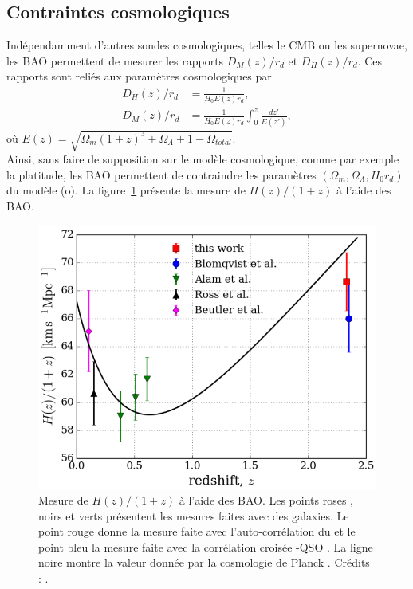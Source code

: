 \documentclass[11pt, twoside, a4paper, openright]{report}
\begin{document}
\subsection{Contraintes cosmologiques}
Indépendamment d'autres sondes cosmologiques, telles le CMB ou les supernovae, les BAO permettent de mesurer les rapports $D_M(z) / r_d$ et $D_H(z) / r_d$. Ces rapports sont reliés aux paramètres cosmologiques par
\begin{align}
  D_H(z) / r_d &= \frac{1}{H_0 E(z) r_d}, \\
  D_M(z) / r_d &= \frac{1}{H_0 E(z) r_d} \int_0^z \frac{dz'}{E(z')},
\end{align}
où $E(z) = \sqrt{\Omega_m (1+z)^3 + \Omega_{\Lambda} + 1 - \Omega_{total}}$. \\
Ainsi, sans faire de supposition sur le modèle cosmologique, comme par exemple la platitude, les BAO permettent de contraindre les paramètres $(\Omega_{m} , \Omega_{\Lambda} , H_0 r_d)$ du modèle (o)\lcdm{}.
La figure~\ref{fig:h_vs_z} présente la mesure de $H(z) / (1+z)$ à l'aide des BAO.
\begin{figure}
  \centering
  \includegraphics[scale=0.35]{h_vs_z}
  \caption{Mesure de $H(z) / (1+z)$ à l'aide des BAO. Les points roses \autocite{Beutler2011}, noirs \autocite{Ross2014a} et verts \autocite{Alam2016} présentent les mesures faites avec des galaxies. Le point rouge donne la mesure faite avec l'auto-corrélation du \lya{} \autocite{Agathe2019a} et le point bleu la mesure faite avec la corrélation croisée \lya{}-QSO \autocite{Blomqvist2019a}. La ligne noire montre la valeur donnée par la cosmologie de Planck \autocite{planck_collaboration_planck_2015}. Crédits : \textcite{Agathe2019a}.}
  \label{fig:h_vs_z}
\end{figure}
\end{document}
